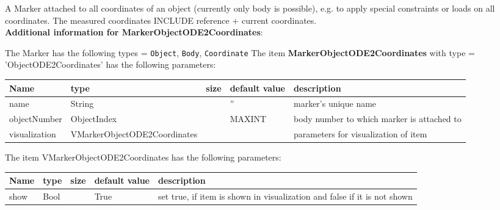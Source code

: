 \label{sec:item:MarkerObjectODE2Coordinates}
A Marker attached to all coordinates of an object (currently only body is possible), e.g. to apply special constraints or loads on all coordinates. The measured coordinates INCLUDE reference + current coordinates.\vspace{12pt}
 \\{\bf Additional information for MarkerObjectODE2Coordinates}:
\bi
  \item The Marker has the following types = \texttt{Object}, \texttt{Body}, \texttt{Coordinate}
\ei
\vspace{12pt} \noindent The item {\bf MarkerObjectODE2Coordinates} with type = 'ObjectODE2Coordinates' has the following parameters:\vspace{-1cm}\\ 
\begin{center}
  \footnotesize
  \begin{longtable}{| p{4.5cm} | p{2.5cm} | p{0.5cm} | p{2.5cm} | p{6cm} |}
    \hline
    \bf Name & \bf type & \bf size & \bf default value & \bf description \\ \hline
    name &     String &      &     '' &     marker's unique name\\ \hline
    objectNumber &     ObjectIndex &      &     MAXINT &     body number to which marker is attached to\\ \hline
    visualization & VMarkerObjectODE2Coordinates & & & parameters for visualization of item \\ \hline
	  \end{longtable}
	\end{center}
The item VMarkerObjectODE2Coordinates has the following parameters:\vspace{-1cm}\\ 
\begin{center}
  \footnotesize
  \begin{longtable}{| p{4.5cm} | p{2.5cm} | p{0.5cm} | p{2.5cm} | p{6cm} |}
    \hline
    \bf Name & \bf type & \bf size & \bf default value & \bf description \\ \hline
    show &     Bool &      &     True &     set true, if item is shown in visualization and false if it is not shown\\ \hline
	  \end{longtable}
	\end{center}
\newpage


